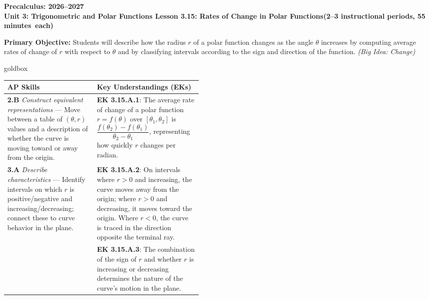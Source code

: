 \documentclass[10pt]{article}
\newcommand{\CourseName}{Precalculus}
\newcommand{\SchoolYear}{2026--2027}
\newcommand{\MeetingLength}{55 minutes}
\newcommand{\UnitNumberName}{Unit 3: Trigonometric and Polar Functions \quad}
\newcommand{\LessonNumberName}{Lesson 3.15: Rates of Change in Polar Functions}
\begin{document}
\begin{center}
  {\Large\bfseries \CourseName: \SchoolYear} \\[4pt]
  {\small\bfseries \UnitNumberName \LessonNumberName \quad (2--3 instructional periods, \MeetingLength\ each)}
\end{center}

\begin{tcolorbox}[colback=sky, colframe=navy, boxrule=0.9pt, arc=2mm,
    left=2mm, right=2mm, top=1.5mm, bottom=1.5mm]
  \textbf{Primary Objective:} Students will describe how the radius $r$ of a polar
  function changes as the angle $\theta$ increases by computing average rates of change
  of $r$ with respect to $\theta$ and by classifying intervals according to the sign
  and direction of the function. \textit{(Big Idea: Change)}
\end{tcolorbox}

\vspace{0.08in}

\begin{skillbox}{goldbox}
\begin{tabularx}{\linewidth}{@{} p{0.46\linewidth} X @{}}
\textbf{AP Skills} & \textbf{Key Understandings (EKs)} \\
\midrule
\textbf{2.B} \textit{Construct equivalent representations} ---
  Move between a table of $(θ, r)$ values and a description of whether
  the curve is moving toward or away from the origin.
&
\textbf{EK 3.15.A.1}: The average rate of change of a polar function
$r = f(\theta)$ over $[\theta_1, \theta_2]$ is
$\dfrac{f(\theta_2) - f(\theta_1)}{\theta_2 - \theta_1}$, representing
how quickly $r$ changes per radian. \\[6pt]

\textbf{3.A} \textit{Describe characteristics} ---
  Identify intervals on which $r$ is positive/negative and
  increasing/decreasing; connect these to curve behavior in the plane.
&
\textbf{EK 3.15.A.2}: On intervals where $r > 0$ and increasing, the
curve moves away from the origin; where $r > 0$ and decreasing, it
moves toward the origin. Where $r < 0$, the curve is traced in the
direction opposite the terminal ray. \\[6pt]

&
\textbf{EK 3.15.A.3}: The combination of the sign of $r$ and whether $r$
is increasing or decreasing determines the nature of the curve's motion
in the plane. \\
\end{tabularx}
\end{skillbox}
\end{document}
